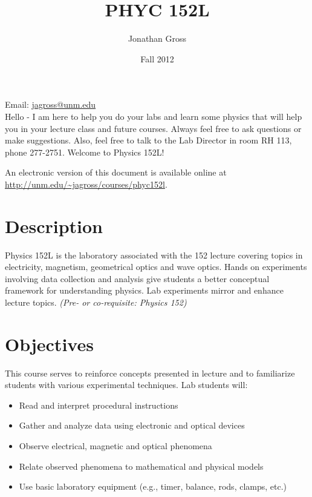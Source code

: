 \documentclass{article}
\title{PHYC 152L}
\author{Jonathan Gross}
\date{Fall 2012}
\begin{document}
\maketitle
\noindent Email: \href{mailto:jagross@unm.edu}{jagross@unm.edu} \\

Hello - I am here to help you do your labs and learn some physics that will
help you in your lecture class and future courses. Always feel free to ask
questions or make suggestions.  Also, feel free to talk to the Lab Director in
room RH 113, phone 277-2751. Welcome to Physics 152L!

An electronic version of this document is available online at
\url{http://unm.edu/~jagross/courses/phyc152l}.

\section*{Description}
Physics 152L is the laboratory associated with the 152 lecture covering topics
in electricity, magnetism, geometrical optics and wave optics. Hands on
experiments involving data collection and analysis give students a better
conceptual framework for understanding physics. Lab experiments mirror and
enhance lecture topics. \emph{(Pre- or co-requisite: Physics 152)}

\section*{Objectives}
This course serves to reinforce concepts presented in lecture and to
familiarize students with various experimental techniques. Lab students will:
\begin{itemize}
\item Read and interpret procedural instructions
\item Gather and analyze data using electronic and optical devices
\item Observe electrical, magnetic and optical phenomena
\item Relate observed phenomena to mathematical and physical models
\item Use basic laboratory equipment (e.g., timer, balance, rods, clamps, etc.)
\end{itemize}
\end{document}
